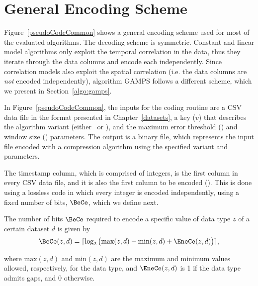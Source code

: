 

\clearpage
\section{General Encoding Scheme}
\label{algo:details}


\vspace{-5pt}
Figure~\ref{pseudoCodeCommon} shows a general encoding scheme used for most of the evaluated algorithms. The decoding scheme is symmetric. Constant and linear model algorithms only exploit the temporal correlation in the data, thus they iterate through the data columns and encode each independently. Since correlation models also exploit the spatial correlation (i.e. the data columns are \textit{not} encoded independently), algorithm GAMPS follows a different scheme, which we present in Section~\ref{algo:gamps}.


In Figure~\ref{pseudoCodeCommon}, the inputs for the coding routine are a CSV data file in the format presented in Chapter~\ref{datasets}, a key ($v$) that describes the algorithm variant (either \maskalgo\ or \NOmaskalgo), and the maximum error threshold (\maxerror) and window size (\win) parameters. The output is a binary file, which represents the input file encoded with a compression algorithm using the specified variant and parameters.


\vspace{+5pt}



The timestamp column, which is comprised of integers, is the first column in every CSV data file, and it is also the first column to be encoded (). This is done using a lossless code in which every integer is encoded independently, using a fixed number of bits, $\BeCe$, which we define next.


\begin{defcion}
The number of bits $\BeCe$ required to encode a specific value of data type $z$ of a certain dataset $d$ is given by
\vspace{-5pt}
\begin{equation}
\label{eq:bece}
\BeCe(z, d) = \lceil{ \log_2 \big( \text{max}(z, d) - \text{min}(z, d) + \EneCe(z, d) \big) } \rceil,
\end{equation}
\end{defcion}
\vspace{-5pt}
where $\text{max}(z, d)$ and $\text{min}(z, d)$ are the maximum and minimum values allowed, respectively, for the data type, and $\EneCe(z, d)$ is 1 if the data type admits gaps, and 0 otherwise.


